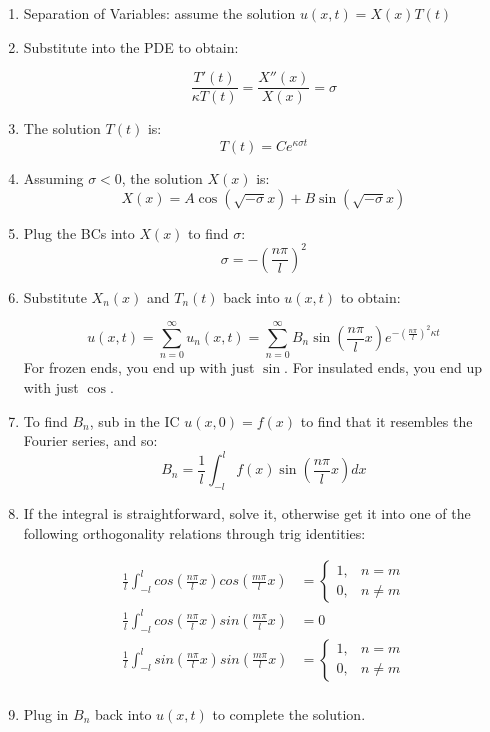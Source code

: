 \documentclass[11pt]{article}
\begin{document}
\begin{enumerate}

\item Separation of Variables: assume the solution $u(x,t) = X(x)T(t)$
\item Substitute into the PDE to obtain:

$$ \frac{T'(t)}{\kappa T(t)} = \frac{X''(x)}{X(x)} = \sigma $$

\item The solution $T(t)$ is:
$$ T(t) = Ce^{\kappa \sigma t}$$

\item Assuming $\sigma < 0$, the solution $X(x)$ is:
$$ X(x) = A\cos(\sqrt{-\sigma}x) + B\sin(\sqrt{-\sigma}x) $$

\item Plug the BCs into $X(x)$ to find $\sigma$:
$$ \sigma = - \left( \frac{n\pi}{l} \right)^2 $$
\item Substitute $X_n(x)$ and $T_n(t)$ back into $u(x,t)$ to obtain:

$$ u(x,t) = \sum \limits_{n=0}^{\infty} u_n(x,t) = \sum \limits_{n=0}^{\infty} B_n \sin(\frac{n\pi}{l}x)e^{-(\frac{n\pi}{l})^2\kappa t}$$
For frozen ends, you end up with just $\sin$. For insulated ends, you end up with just $\cos$.

\item To find $B_n$, sub in the IC $u(x,0)=f(x)$ to find that it resembles the Fourier series, and so:
$$ B_n = \frac{1}{l} \int_{-l}^{l} f(x) \sin(\frac{n\pi}{l}x) dx$$

\item If the integral is straightforward, solve it, otherwise get it into one of the following orthogonality relations through trig identities:

\begin{align*}
	\frac{1}{l} \int_{-l}^{l} cos(\frac{n\pi}{l}x)cos(\frac{m\pi}{l}x) &=
		\begin{cases}
			1, & n=m \\
			0, & n\neq m
		\end{cases}\\
\frac{1}{l} \int_{-l}^{l} cos(\frac{n\pi}{l}x)sin(\frac{m\pi}{l}x) &= 0 \\
\frac{1}{l} \int_{-l}^{l} sin(\frac{n\pi}{l}x)sin(\frac{m\pi}{l}x) &=
		\begin{cases}
			1, & n=m \\
			0, & n\neq m
		\end{cases}\\
\end{align*}

\item Plug in $B_n$ back into $u(x,t)$ to complete the solution.

\end{enumerate}
\end{document}
